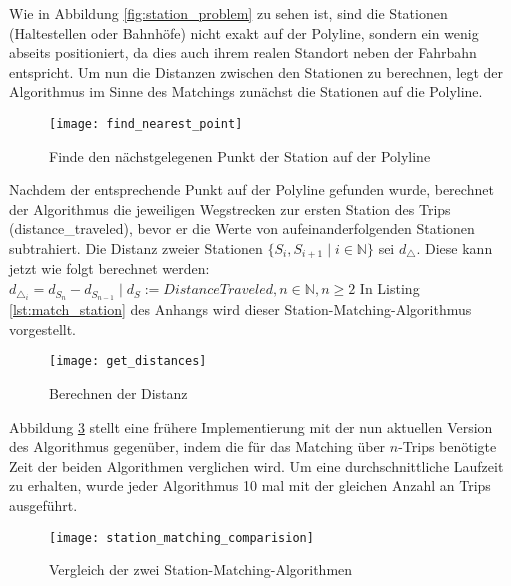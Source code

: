     Wie in Abbildung \ref{fig:station_problem} zu sehen ist, sind die Stationen (Haltestellen oder Bahnhöfe) nicht exakt auf der Polyline, sondern ein wenig abseits positioniert, da dies auch ihrem realen Standort neben der Fahrbahn entspricht. Um nun die Distanzen zwischen den Stationen zu berechnen, legt der Algorithmus im Sinne des Matchings zunächst die Stationen auf die Polyline.  

    \begin{figure}[htbp]
      \begin{center}
        \texttt{[image: find\_nearest\_point]}
        \caption{Finde den nächstgelegenen Punkt der Station auf der Polyline}
        \label{fig:find_nearest_point}
      \end{center}
    \end{figure}

    Nachdem der entsprechende Punkt auf der Polyline gefunden wurde, berechnet der Algorithmus die jeweiligen Wegstrecken zur ersten Station des Trips (distance\_traveled), bevor er die Werte von aufeinanderfolgenden Stationen subtrahiert.  Die Distanz zweier Stationen $\{S_i,S_{i+1} \;|\; i \in \mathbb{N} \}$ sei $d_\triangle$. Diese kann jetzt wie folgt berechnet werden: $d_{\triangle_i} = d_{S_n} - d_{S_{n-1}}\;|\; d_S := DistanceTraveled, n \in \mathbb{N}, n \ge 2$ 
    In Listing \ref{lst:match_station} des Anhangs wird dieser Station-Matching-Algorithmus vorgestellt.

    \begin{figure}[htbp]
      \begin{center}
        \texttt{[image: get\_distances]}
        \caption{Berechnen der Distanz}
        \label{fig:get_distances}
      \end{center}
    \end{figure}
    
    Abbildung \ref{fig:station_matching_comparision} stellt eine frühere Implementierung mit der nun aktuellen Version des Algorithmus gegenüber, indem die für das Matching über $n$-Trips benötigte Zeit der beiden Algorithmen verglichen wird. Um eine durchschnittliche Laufzeit zu erhalten, wurde jeder Algorithmus 10 mal mit der gleichen Anzahl an Trips ausgeführt.

    \begin{figure}[htbp]
      \begin{center}
        \texttt{[image: station\_matching\_comparision]}
        \caption{Vergleich der zwei Station-Matching-Algorithmen}
        \label{fig:station_matching_comparision}
      \end{center}
    \end{figure}

